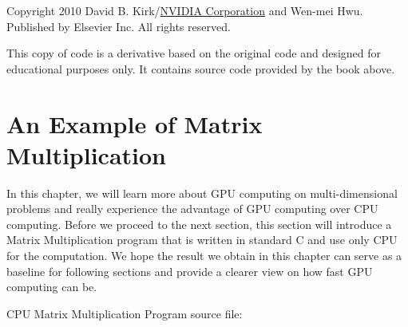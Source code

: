 \documentclass[letterpaper,10pt,openany,oneside]{sphinxmanual}
\begin{document}
Copyright 2010 David B. Kirk/\href{http://www.nvidia.com}{NVIDIA Corporation} and Wen-mei Hwu. Published by Elsevier Inc.  All rights reserved.

This copy of code is a derivative based on the original code and designed for educational purposes only. It contains source code provided by the book above.


\section{An Example of Matrix Multiplication}
\label{CUDA2D/CUDA2D:nvidia-corporation}\label{CUDA2D/CUDA2D:an-example-of-matrix-multiplication}
In this chapter, we will learn more about GPU computing on multi-dimensional problems and really experience the advantage of GPU computing over CPU computing. Before we proceed to the next section, this section will introduce a Matrix Multiplication program that is written in standard C and use only CPU for the computation. We hope the result we obtain in this chapter can serve as a baseline for following sections and provide a clearer view on how fast GPU computing can be.

CPU Matrix Multiplication Program source file:
\end{document}
